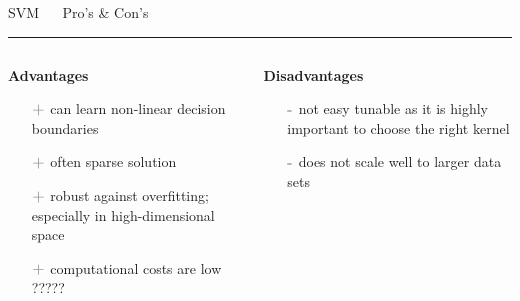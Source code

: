 \documentclass[11pt,compress,t,notes=noshow, xcolor=table]{beamer}
\begin{document}

\LARGE
\begin{frame}{\textcolor{gray!80}{SVM} ~~ Pro's \& Con's}
\normalsize
\vspace{-0.5cm}
\noindent \textcolor{gray!80}{\rule{\textwidth}{1pt}}

\vspace{0.3cm}

\footnotesize


\begin{columns}[onlytextwidth]
  \begin{column}{0.5\textwidth}
    \textbf{\textcolor{gray!80}{Advantages}}
    \footnotesize
    \begin{itemize}
      \item[$\textbf{\textcolor{gray!80}{+}}$] can learn non-linear decision boundaries
      \item [$\textbf{\textcolor{gray!80}{+}}$] often sparse solution
      \item[$\textbf{\textcolor{gray!80}{+}}$] robust against overfitting; especially in high-dimensional space 
      \item[$\textbf{\textcolor{gray!80}{+}}$] computational costs are low ????? 
    \end{itemize}
  \end{column}

  \begin{column}{0.5\textwidth}
    \textbf{\textcolor{gray!80}{Disadvantages}}
    \footnotesize
    \begin{itemize}
      \item[$\textbf{\textcolor{gray!80}{-}}$] not easy tunable as it is highly important to choose the right kernel
      \item[$\textbf{\textcolor{gray!80}{-}}$] does not scale well to larger data sets
    \end{itemize}
  \end{column}
\end{columns}

\vfill

\small


\end{frame}

\end{document}

